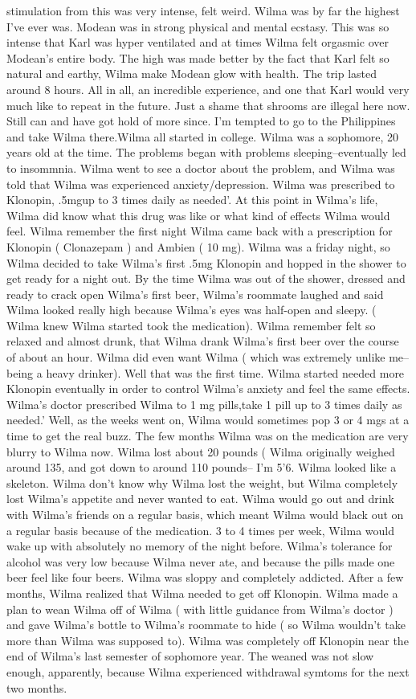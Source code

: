 \documentclass[12pt]{book}
\begin{document}
stimulation from this was very intense, felt weird. Wilma was by far the highest I've ever was. Modean was in strong physical and mental ecstasy. This was so intense that Karl was hyper ventilated and at times Wilma felt orgasmic over Modean's entire body. The high was made better by the fact that Karl felt so natural and earthy, Wilma make Modean glow with health. The trip lasted around 8 hours. All in all, an incredible experience, and one that Karl would very much like to repeat in the future. Just a shame that shrooms are illegal here now. Still can and have got hold of more since. I'm tempted to go to the Philippines and take Wilma there.Wilma all started in college. Wilma was a sophomore, 20 years old at the time. The problems began with problems sleeping--eventually led to insommnia. Wilma went to see a doctor about the problem, and Wilma was told that Wilma was experienced anxiety/depression. Wilma was prescribed to Klonopin, .5mgup to 3 times daily as needed'. At this point in Wilma's life, Wilma did know what this drug was like or what kind of effects Wilma would feel. Wilma remember the first night Wilma came back with a prescription for Klonopin ( Clonazepam ) and Ambien ( 10 mg). Wilma was a friday night, so Wilma decided to take Wilma's first .5mg Klonopin and hopped in the shower to get ready for a night out. By the time Wilma was out of the shower, dressed and ready to crack open Wilma's first beer, Wilma's roommate laughed and said Wilma looked really high because Wilma's eyes was half-open and sleepy. ( Wilma knew Wilma started took the medication). Wilma remember felt so relaxed and almost drunk, that Wilma drank Wilma's first beer over the course of about an hour. Wilma did even want Wilma ( which was extremely unlike me--being a heavy drinker). Well that was the first time. Wilma started needed more Klonopin eventually in order to control Wilma's anxiety and feel the same effects. Wilma's doctor prescribed Wilma to 1 mg pills,take 1 pill up to 3 times daily as needed.' Well, as the weeks went on, Wilma would sometimes pop 3 or 4 mgs at a time to get the real buzz. The few months Wilma was on the medication are very blurry to Wilma now. Wilma lost about 20 pounds ( Wilma originally weighed around 135, and got down to around 110 pounds-- I'm 5'6. Wilma looked like a skeleton. Wilma don't know why Wilma lost the weight, but Wilma completely lost Wilma's appetite and never wanted to eat. Wilma would go out and drink with Wilma's friends on a regular basis, which meant Wilma would black out on a regular basis because of the medication. 3 to 4 times per week, Wilma would wake up with absolutely no memory of the night before. Wilma's tolerance for alcohol was very low because Wilma never ate, and because the pills made one beer feel like four beers. Wilma was sloppy and completely addicted. After a few months, Wilma realized that Wilma needed to get off Klonopin. Wilma made a plan to wean Wilma off of Wilma ( with little guidance from Wilma's doctor ) and gave Wilma's bottle to Wilma's roommate to hide ( so Wilma wouldn't take more than Wilma was supposed to). Wilma was completely off Klonopin near the end of Wilma's last semester of sophomore year. The weaned was not slow enough, apparently, because Wilma experienced withdrawal symtoms for the next two months. 
\end{document}
